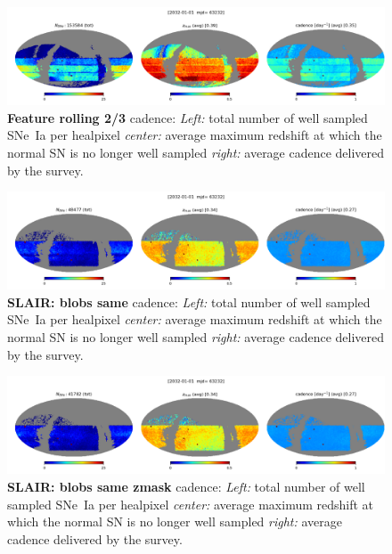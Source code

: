 \begin{figure}[h!]
  \begin{center}
    \includegraphics[width=\linewidth]{Figures/feature_rolling_twoThird_10yrs_64_maps.png}
    \caption{{\bf Feature rolling 2/3} cadence: {\em Left:} total number of well
      sampled SNe~Ia per healpixel {\em center:} average maximum
      redshift at which the normal SN is no longer well sampled {\em
        right:} average cadence delivered by the survey.}
  \end{center}
\end{figure}

\begin{figure}[h!]
  \begin{center}
    \includegraphics[width=\linewidth]{Figures/blobs_same_10yrs_64_maps.png}
    \caption{{\bf SLAIR: blobs same} cadence: {\em Left:} total number of well
      sampled SNe~Ia per healpixel {\em center:} average maximum
      redshift at which the normal SN is no longer well sampled {\em
        right:} average cadence delivered by the survey.}
  \end{center}
\end{figure}

\begin{figure}[h!]
  \begin{center}
    \includegraphics[width=\linewidth]{Figures/blobs_same_zmask10yrs_64_maps.png}
    \caption{{\bf SLAIR: blobs same zmask} cadence: {\em Left:} total number of well
      sampled SNe~Ia per healpixel {\em center:} average maximum
      redshift at which the normal SN is no longer well sampled {\em
        right:} average cadence delivered by the survey.}
  \end{center}
\end{figure}

